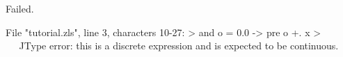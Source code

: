 \chklistingfalse
{}
\begin{ChkListingMsg}
Failed.
\end{ChkListingMsg}
\begin{ChkListingErr}
File "tutorial.zls", line 3, characters 10-27:
>  and o = 0.0 -> pre o +. x
>          ^^^^^^^^^^^^^^^^^
Type error: this is a discrete expression and is expected to be continuous.
\end{ChkListingErr}
